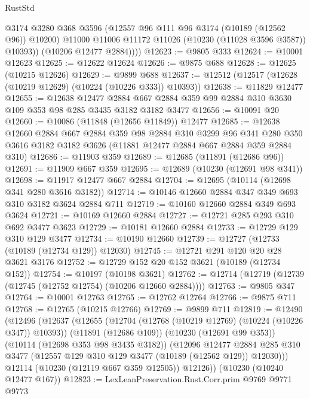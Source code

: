 \begin{lexlean}{RustStd}
\begin{coremodule}
              @3174
              @3280
              @368
              @3596
              (@12557 @96 @111 @96 @3174 (@10189 (@12562 @96)) @10200)
              @11000
              @11006
              @11172
              @11026
              (@10230 (@11028 @3596 @3587))
              @10393))
          (@10206 @12477 @2884))))
@12623 := @9805 @333
@12624 := @10001 @12623
@12625 := @12622 @12624
@12626 := @9875 @688
@12628 := @12625 (@10215 @12626)
@12629 := @9899 @688
@12637 := @12512 (@12517 (@12628 (@10219 @12629) (@10224 (@10226 @333)) @10393))
@12638 := @11829 @12477
@12655 := @12638
    @12477
    @2884
    @667
    @2884
    @359
    @99
    @2884
    @310
    @3630
    @109
    @353
    @98
    @285
    @3435
    @3182
    @3182
    @3477
@12656 := @10091 @20
@12660 := @10086 (@11848 (@12656 @11849)) @12477
@12685 := @12638
    @12660
    @2884
    @667
    @2884
    @359
    @98
    @2884
    @310
    @3299
    @96
    @341
    @280
    @350
    @3616
    @3182
    @3182
    @3626
    (@11881 @12477 @2884 @667 @2884 @359 @2884 @310)
@12686 := @11903 @359
@12689 := @12685 (@11891 (@12686 @96))
@12691 := @11909 @667 @359
@12695 := @12689 (@10230 (@12691 @98 @341))
@12698 := @11917 @12477 @667 @2884
@12704 := @12695 (@10114 (@12698 @341 @280 @3616 @3182))
@12714 := @10146 @12660 @2884 @347 @349 @693 @310 @3182 @3624 @2884 @711
@12719 := @10160 @12660 @2884 @349 @693 @3624
@12721 := @10169 @12660 @2884
@12727 := @12721 @285 @293 @310 @692 @3477 @3623
@12729 := @10181 @12660 @2884
@12733 := @12729 @129 @310 @129 @3477
@12734 := @10190 @12660
@12739 := @12727 (@12733 (@10189 (@12734 @129)) @12030)
@12745 := @12721 @291 @120 @20 @28 @3621 @3176
@12752 := @12729 @152 @20 @152 @3621 (@10189 (@12734 @152))
@12754 := @10197 (@10198 @3621)
@12762 := @12714 (@12719 (@12739 (@12745 (@12752 @12754) (@10206 @12660 @2884))))
@12763 := @9805 @347
@12764 := @10001 @12763
@12765 := @12762 @12764
@12766 := @9875 @711
@12768 := @12765 (@10215 @12766)
@12769 := @9899 @711
@12819 := @12490
    (@12496
      (@12637
        (@12655
          (@12704 (@12768 (@10219 @12769) (@10224 (@10226 @347)) @10393))
          (@11891 (@12686 @109))
          (@10230 (@12691 @99 @353))
          (@10114 (@12698 @353 @98 @3435 @3182))
          (@12096
            @12477
            @2884
            @285
            @310
            @3477
            (@12557 @129 @310 @129 @3477 (@10189 (@12562 @129)) @12030)))
        @12114
        (@10230 (@12119 @667 @359 @12505))
        @12126))
    (@10230 (@10240 @12477 @167))
@12823 := LexLeanPreservation.Rust.Corr.prim @9769 @9771 @9773

\end{coremodule}
\end{lexlean}
